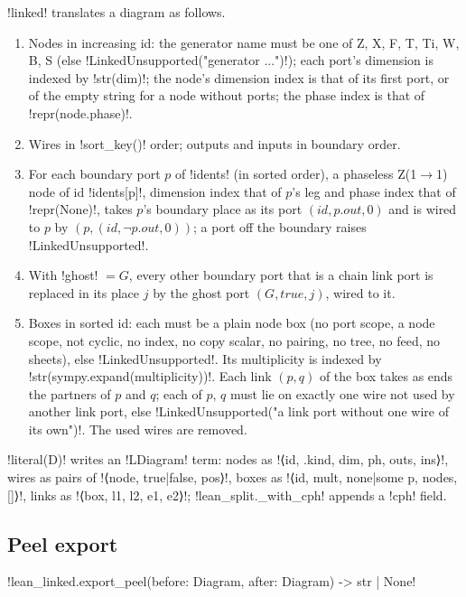\py!linked! translates a diagram as follows.
\begin{enumerate}
\item Nodes in increasing id: the generator name must be one of Z, X, F, T, Ti, W, B, S (else \py!LinkedUnsupported("generator ...")!); each port's dimension is indexed by \py!str(dim)!; the node's dimension index is that of its first port, or of the empty string for a node without ports; the phase index is that of \py!repr(node.phase)!.
\item Wires in \py!sort_key()! order; outputs and inputs in boundary order.
\item For each boundary port $p$ of \py!idents! (in sorted order), a phaseless Z(1$\to$1) node of id \py!idents[p]!, dimension index that of $p$'s leg and phase index that of \py!repr(None)!, takes $p$'s boundary place as its port $(\mathit{id},p.\mathit{out},0)$ and is wired to $p$ by $(p,(\mathit{id},\lnot p.\mathit{out},0))$; a port off the boundary raises \py!LinkedUnsupported!.
\item With \py!ghost! $=G$, every other boundary port that is a chain link port is replaced in its place $j$ by the ghost port $(G,\mathit{true},j)$, wired to it.
\item Boxes in sorted id: each must be a plain node box (no port scope, a node scope, not cyclic, no index, no copy scalar, no pairing, no tree, no feed, no sheets), else \py!LinkedUnsupported!. Its multiplicity is indexed by \py!str(sympy.expand(multiplicity))!. Each link $(p,q)$ of the box takes as ends the partners of $p$ and $q$; each of $p$, $q$ must lie on exactly one wire not used by another link port, else \py!LinkedUnsupported("a link port without one wire of its own")!. The used wires are removed.
\end{enumerate}

\py!literal(D)! writes an \lean!LDiagram! term: nodes as \lean!⟨id, .kind, dim, ph, outs, ins⟩!, wires as pairs of \lean!⟨node, true|false, pos⟩!, boxes as \lean!⟨id, mult, none|some p, nodes, []⟩!, links as \lean!⟨box, l1, l2, e1, e2⟩!; \py!lean_split._with_cph! appends a \lean!cph! field.

\subsection{Peel export}

\begin{signature}
\py!lean_linked.export_peel(before: Diagram, after: Diagram) -> str | None!
\end{signature}

